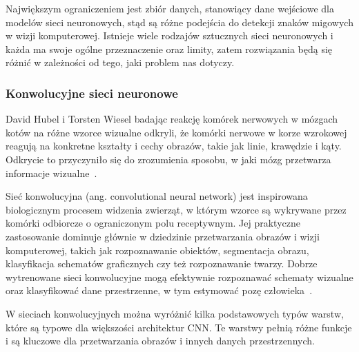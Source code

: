 Największym ograniczeniem jest zbiór danych, stanowiący dane wejściowe dla modelów sieci neuronowych, stąd są różne podejścia do detekcji znaków migowych w wizji komputerowej. Istnieje wiele rodzajów sztucznych sieci neuronowych i każda ma swoje ogólne przeznaczenie oraz limity, zatem rozwiązania będą się różnić w zależności od tego, jaki problem nas dotyczy.

\subsubsection{Konwolucyjne sieci neuronowe}
\label{subsubsec:convolutional-neural-networks}

David Hubel i Torsten Wiesel badając reakcję komórek nerwowych w mózgach kotów na różne wzorce wizualne odkryli, że komórki nerwowe w korze wzrokowej reagują na konkretne kształty i cechy obrazów, takie jak linie, krawędzie i kąty. Odkrycie to przyczyniło się do zrozumienia sposobu, w jaki mózg przetwarza informacje wizualne~\cite{hubel1968}.

Sieć konwolucyjna (ang. convolutional neural network) jest inspirowana biologicznym procesem widzenia zwierząt, w którym wzorce są wykrywane przez komórki odbiorcze o ograniczonym polu receptywnym. Jej praktyczne zastosowanie dominuje głównie w dziedzinie przetwarzania obrazów i wizji komputerowej, takich jak rozpoznawanie obiektów, segmentacja obrazu, klasyfikacja schematów graficznych czy też rozpoznawanie twarzy. Dobrze wytrenowane sieci konwolucyjne mogą efektywnie rozpoznawać schematy wizualne oraz klasyfikować dane przestrzenne, w tym estymować pozę człowieka~\cite{gu2018}.

W sieciach konwolucyjnych można wyróżnić kilka podstawowych typów warstw, które są typowe dla większości architektur CNN. Te warstwy pełnią różne funkcje i są kluczowe dla przetwarzania obrazów i innych danych przestrzennych.

